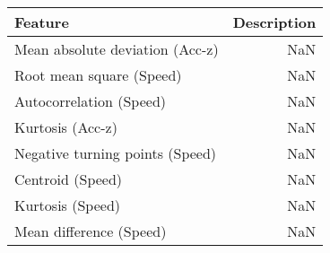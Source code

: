 \begin{table}
\centering
\label{table:reg_fs}
\begin{tabular}{lr}
\toprule
               \textbf{Feature} & \textbf{Description} \\
\midrule
Mean absolute deviation (Acc-z) &                  NaN \\
       Root mean square (Speed) &                  NaN \\
        Autocorrelation (Speed) &                  NaN \\
               Kurtosis (Acc-z) &                  NaN \\
Negative turning points (Speed) &                  NaN \\
               Centroid (Speed) &                  NaN \\
               Kurtosis (Speed) &                  NaN \\
        Mean difference (Speed) &                  NaN \\
\bottomrule
\end{tabular}
\end{table}
